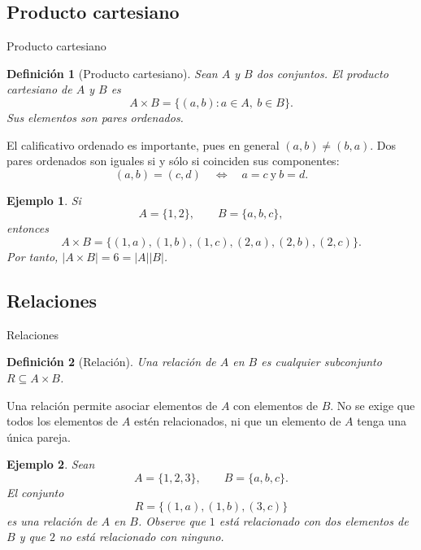 \documentclass[aspectratio=169,10pt]{beamer}
\newtheorem{definicion}{Definición}
\newtheorem{ejemplo}{Ejemplo}
\begin{document}
\subsection{Producto cartesiano}
\begin{frame}{Producto cartesiano}


\begin{definicion}[Producto cartesiano]
Sean $A$ y $B$ dos conjuntos. El \emph{producto cartesiano} de $A$ y $B$ es
\[
A\times B=\{(a,b):a\in A,\ b\in B\}.
\]
Sus elementos son pares ordenados.
\end{definicion}

El calificativo ordenado es importante, pues en general $(a,b)\neq(b,a)$.
Dos pares ordenados son iguales si y sólo si coinciden sus componentes:
\[
(a,b)=(c,d)
\quad\Longleftrightarrow\quad
a=c\ \text{y}\ b=d.
\]

\begin{ejemplo}
Si
\[
A=\{1,2\},\qquad B=\{a,b,c\},
\]
entonces
\[
A\times B=
\{(1,a),(1,b),(1,c),(2,a),(2,b),(2,c)\}.
\]
Por tanto, $|A\times B|=6=|A||B|$.
\end{ejemplo}

\end{frame}
\subsection{Relaciones}
\begin{frame}{Relaciones}

\begin{definicion}[Relación]
Una relación de $A$ en $B$ es cualquier subconjunto $R\subseteq A\times B$.
\end{definicion}

Una relación permite asociar elementos de $A$ con elementos de $B$. No se
exige que todos los elementos de $A$ estén relacionados, ni que un elemento de $A$ tenga una única pareja.

\begin{ejemplo}
Sean
\[
A=\{1,2,3\},\qquad B=\{a,b,c\}.
\]
El conjunto
\[
R=\{(1,a),(1,b),(3,c)\}
\]
es una relación de $A$ en $B$. Observe que $1$ está relacionado con dos
elementos de $B$ y que $2$ no está relacionado con ninguno.
\end{ejemplo}


\end{frame}
\end{document}
